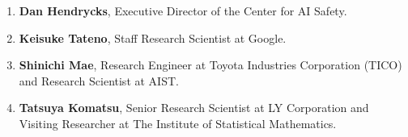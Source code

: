 \documentclass{article}
\begin{document}
\begin{enumerate}
    \item {\bf Dan Hendrycks}, Executive Director of the Center for AI Safety.

    \item {\bf Keisuke Tateno}, Staff Research Scientist at Google.

    \item {\bf Shinichi Mae}, Research Engineer at Toyota Industries Corporation (TICO) and Research Scientist at AIST.

    \item {\bf Tatsuya Komatsu}, Senior Research Scientist at LY Corporation and Visiting Researcher at The Institute of Statistical Mathematics. 


\end{enumerate}
\end{document}
